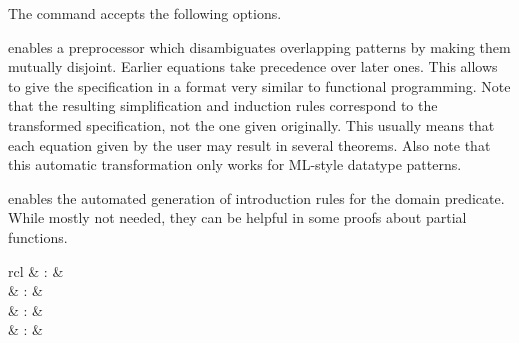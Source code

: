 \begin{isabellebody}
\begin{isamarkuptext}
  The \hyperlink{command.HOL.function}{\mbox{}} command accepts the following
  options.

  \begin{description}

  \item {} enables a preprocessor which disambiguates
  overlapping patterns by making them mutually disjoint.  Earlier
  equations take precedence over later ones.  This allows to give the
  specification in a format very similar to functional programming.
  Note that the resulting simplification and induction rules
  correspond to the transformed specification, not the one given
  originally. This usually means that each equation given by the user
  may result in several theorems.  Also note that this automatic
  transformation only works for ML-style datatype patterns.

  \item {} enables the automated generation of
  introduction rules for the domain predicate. While mostly not
  needed, they can be helpful in some proofs about partial functions.

  \end{description}%
\end{isamarkuptext}%
\isamarkuptrue%
%
\isamarkuptrue%
%
\begin{isamarkuptext}%
\begin{matharray}{rcl}
    \hypertarget{method.HOL.pat-completeness}{\hyperlink{method.HOL.pat-completeness}{\mbox{}}} & : &  \\
    \hypertarget{method.HOL.relation}{\hyperlink{method.HOL.relation}{\mbox{}}} & : &  \\
    \hypertarget{method.HOL.lexicographic-order}{\hyperlink{method.HOL.lexicographic-order}{\mbox{}}} & : &  \\
    \hypertarget{method.HOL.size-change}{\hyperlink{method.HOL.size-change}{\mbox{}}} & : &  \\
  \end{matharray}


\end{isamarkuptext}
\end{isabellebody}
